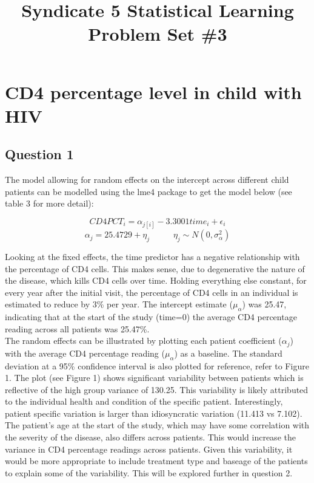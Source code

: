 \documentclass[12pt]{article}
\begin{document}
\title{Syndicate 5 Statistical Learning Problem Set \#3}
\maketitle
{\setlength{\parindent}{0cm}


\section*{CD4 percentage level in child with HIV}
\subsection*{Question 1}
The model allowing for random effects on the intercept across different child patients can be modelled using the lme4 package to get the model below (see table 3 for more detail):

$$CD4PCT_i = \alpha_{j[i]} -3.3001 time_i + \epsilon_i$$
$$\alpha_j = 25.4729 + \eta_j \; \; \;\;\;\; \;\;\;\;\eta_j \sim N(0, \sigma^2_\alpha)$$

Looking at the fixed effects, the time predictor has a negative relationship with the percentage of CD4 cells. This makes sense, due to degenerative the nature of the disease, which kills CD4 cells over time. Holding everything else constant, for every year after the initial visit, the percentage of CD4 cells in an individual is estimated to reduce by 3\% per year. The intercept estimate ($\mu_\alpha$) was 25.47, indicating that at the start of the study (time=0) the average CD4 percentage reading across all patients was 25.47\%.\\


The random effects can be illustrated by plotting each patient coefficient ($\alpha_j$) with the average CD4 percentage reading ($\mu_\alpha$) as a baseline. The standard deviation at a 95\% confidence interval is also plotted for reference, refer to Figure 1. The plot (see Figure 1) shows significant variability between patients which is reflective of the high group variance of 130.25. This variability is likely attributed to the individual health and condition of the specific patient. Interestingly, patient specific variation is larger than idiosyncratic variation (11.413 vs 7.102).\\

The patient’s age at the start of the study, which may have some correlation with the severity of the disease, also differs across patients.  This would increase the variance in CD4 percentage readings across patients. Given this variability, it would be more appropriate to include treatment type and baseage of the patients to explain some of the variability. This will be explored further in question 2.


}
\end{document}

